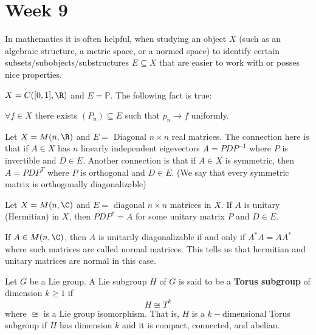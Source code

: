 \section{Week 9}

In mathematics it is often helpful, when studying an object \( X  \) (such as an algebraic structure, a metric space, or a normed space) to identify certain subsets/subobjects/substructures \( E \subseteq  X   \) that are easier to work with or posses nice properties. 


\begin{eg}[Analysis]
    \( X = C ([0,1], \R ) \) and \( E = \mathbb{P} \). The following fact is true:
    \begin{center}
        \( \forall f \in X  \) there exists \( ({P}_{n}) \subseteq  E   \) such that \( {p}_{n} \to f  \) uniformly.
    \end{center}
\end{eg}

\begin{eg}
   Let \( X = M(n, \R ) \) and \( E =  \) Diagonal \( n \times n  \) real matrices. The connection here is that if \( A \in X  \) has \( n  \) linearly independent eigevectors \( A = P D P^{-1} \) where \( P  \) is invertible and \( D \in E  \). Another connection is that if \( A \in X  \) is symmetric, then \( A = P D P^{T} \) where \( P  \) is orthogonal and \( D \in E  \). (We say that every symmetric matrix is orthogonally diagonalizable)  
\end{eg}

\begin{eg}
   Let \( X = M(n,\C) \) and \( E =  \) diagonal \( n \times n  \) matrices in \( X  \). If \( A  \) is unitary (Hermitian) in \( X  \), then \( P D P^{*} = A  \) for some unitary matrix \( P  \) and \( D \in E  \).
\end{eg}

\begin{remark}
   If \( A \in M(n,\C ) \), then \( A  \) is unitarily diagonalizable if and only if \( A^{*}A = A A^{*} \) where such matrices are called normal matrices. This tells us that hermitian and unitary matrices are normal in this case.
\end{remark}

\begin{definition}
   Let \( G  \) be a Lie group. A Lie subgroup \( H  \) of \( G  \) is said to be a \textbf{Torus subgroup} of dimension \( k \geq 1  \) if      
   \[  H \cong T^{k}  \]
   where \( \cong   \) is a Lie group isomorphism. That is, \( H  \) is a \( k- \)dimensional  Torus subgroup if \( H  \) has dimension \( k  \) and it is compact, connected, and abelian.
\end{definition}

